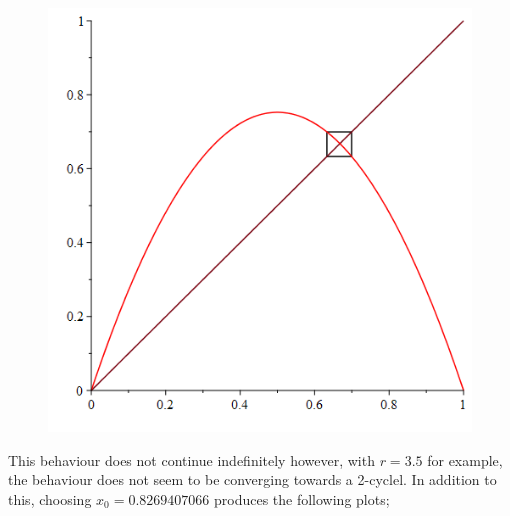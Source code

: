 \documentclass[12pt]{article}
\begin{document}
\begin{figure}[H]
\begin{minipage}{.45\textwidth}
		\includegraphics[scale=0.4]{per3p05PerCob.png}
		\label{fig:test1}
	\end{minipage}%
	\hfill
\end{figure}
This behaviour does not continue indefinitely however, with $r=3.5$ for example, the behaviour does not seem to be converging towards a 2-cyclel. In addition to this, choosing $x_0=0.8269407066$ produces the following plots;
\end{document}
